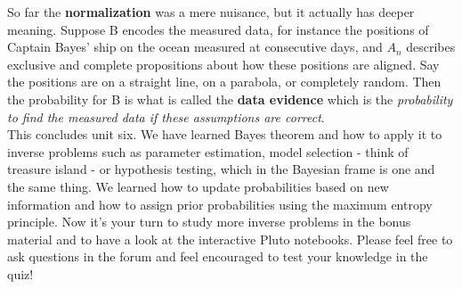 \documentclass[12pt, a4paper]{scrartcl}
\begin{document}
So far the \textbf{normalization} was a mere nuisance, but it actually has deeper
meaning. Suppose B encodes the measured data, for instance the positions of
Captain Bayes’ ship on the ocean measured at consecutive days, and $A_n$
describes exclusive and complete propositions about how these positions are
aligned. Say the positions are on a straight line, on a parabola, or completely
random. Then the probability for B is what is called the \textbf{data evidence} which is the
\textit{probability to ﬁnd the measured data if these assumptions are correct}.\\


This concludes unit six. We have learned Bayes theorem and how to apply
it to inverse problems such as parameter estimation, model selection - think of 
treasure island - or hypothesis testing, which in the Bayesian frame is one
and the same thing.
We learned how to update probabilities based on new information and how
to assign prior probabilities using the maximum entropy principle.
Now it’s your turn to study more inverse problems in the bonus material and
to have a look at the interactive Pluto notebooks.
Please feel free to ask questions in the forum and feel encouraged to test your
knowledge in the quiz!
\end{document}
